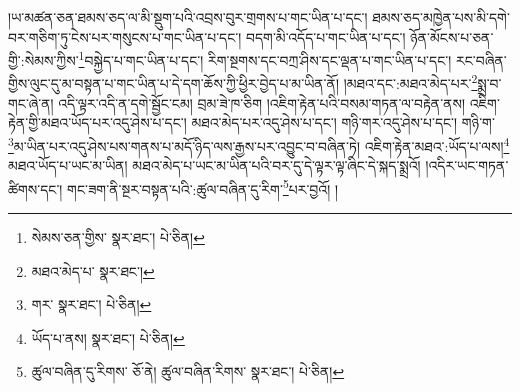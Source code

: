 །ཡ་མཚན་ཅན་ཐམས་ཅད་ལ་མི་སྡུག་པའི་འབྲས་བུར་གྲགས་པ་གང་ཡིན་པ་དང་། ཐམས་ཅད་མཁྱེན་པས་མི་དགེ་བར་གཅིག་ཏུ་ངེས་པར་གསུངས་པ་གང་ཡིན་པ་དང་། བདག་མི་འདོད་པ་གང་ཡིན་པ་དང་། ཉོན་མོངས་པ་ཅན་གྱི་:སེམས་ཀྱིས་\footnote{སེམས་ཅན་གྱིས་  སྣར་ཐང་།  པེ་ཅིན། }བསྐྱེད་པ་གང་ཡིན་པ་དང་། རིག་སྔགས་དང་བཀྲ་ཤིས་དང་ལྡན་པ་གང་ཡིན་པ་དང་། རང་བཞིན་གྱིས་ལུང་དུ་མ་བསྟན་པ་གང་ཡིན་པ་དེ་དག་ཆོས་ཀྱི་ཕྱིར་བྱེད་པ་མ་ཡིན་ནོ། །མཐའ་དང་:མཐའ་མེད་པར་\footnote{མཐའ་མེད་པ་  སྣར་ཐང་། }སྨྲ་བ་གང་ཞེ་ན། འདི་ལྟར་འདི་ན་དགེ་སྦྱོང་ངམ། བྲམ་ཟེ་ཁ་ཅིག །འཇིག་རྟེན་པའི་བསམ་གཏན་ལ་བརྟེན་ནས། འཇིག་རྟེན་གྱི་མཐའ་ཡོད་པར་འདུ་ཤེས་པ་དང་། མཐའ་མེད་པར་འདུ་ཤེས་པ་དང་། གཉི་གར་འདུ་ཤེས་པ་དང་། གཉི་ག་\footnote{གར་  སྣར་ཐང་།  པེ་ཅིན། }མ་ཡིན་པར་འདུ་ཤེས་པས་གནས་པ་མདོ་ཉིད་ལས་རྒྱས་པར་འབྱུང་བ་བཞིན་ཏེ། འཇིག་རྟེན་མཐའ་:ཡོད་པ་ལས།\footnote{ཡོད་པ་ནས།  སྣར་ཐང་།  པེ་ཅིན། } མཐའ་ཡོད་པ་ཡང་མ་ཡིན། མཐའ་མེད་པ་ཡང་མ་ཡིན་པའི་བར་དུ་དེ་ལྟར་ལྟ་ཞིང་དེ་སྐད་སྨྲའོ། །འདིར་ཡང་གཏན་ཚིགས་དང་། གང་ཟག་ནི་སྔར་བསྟན་པའི་:ཚུལ་བཞིན་དུ་རིག་\footnote{ཚུལ་བཞིན་དུ་རིགས་  ཅོ་ནེ། ཚུལ་བཞིན་རིགས་  སྣར་ཐང་།  པེ་ཅིན། }པར་བྱའོ། །
